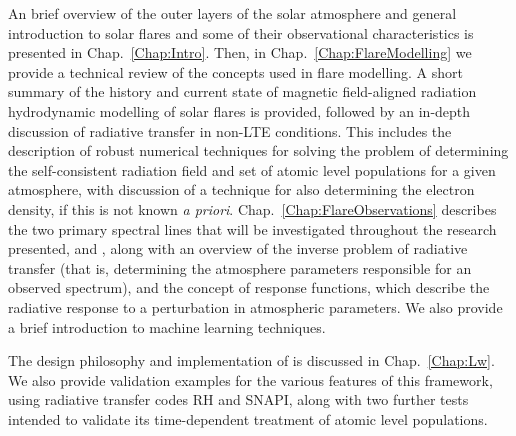 An brief overview of the outer layers of the solar atmosphere and general introduction to solar flares and some of their observational characteristics is presented in Chap.~\ref{Chap:Intro}.
Then, in Chap.~\ref{Chap:FlareModelling} we provide a technical review of the concepts used in flare modelling.
A short summary of the history and current state of magnetic field-aligned radiation hydrodynamic modelling of solar flares is provided, followed by an in-depth discussion of radiative transfer in non-LTE conditions.
This includes the description of robust numerical techniques for solving the problem of determining the self-consistent radiation field and set of atomic level populations for a given atmosphere, with discussion of a technique for also determining the electron density, if this is not known \emph{a priori}.
Chap.~\ref{Chap:FlareObservations} describes the two primary spectral lines that will be investigated throughout the research presented, \Ha{} and \CaLine{}, along with an overview of the inverse problem of radiative transfer (that is, determining the atmosphere parameters responsible for an observed spectrum), and the concept of response functions, which describe the radiative response to a perturbation in atmospheric parameters.
We also provide a brief introduction to machine learning techniques.

The design philosophy and implementation of \Lw{} is discussed in Chap.~\ref{Chap:Lw}.
We also provide validation examples for the various features of this framework, using \Sota{} radiative transfer codes RH and SNAPI, along with two further tests intended to validate its time-dependent treatment of atomic level populations.

